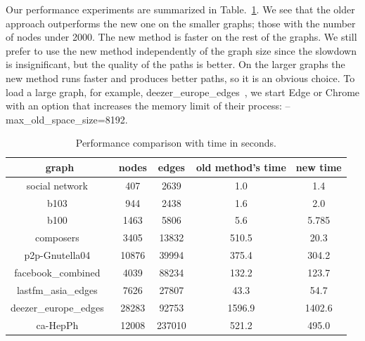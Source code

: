 \documentclass{gd-llncs}
\begin{document}
{Our performance experiments are summarized in Table.~\ref{tab:perf}. We see that the older approach outperforms the new one on the smaller graphs; 
those with the number of nodes under 2000. The new method is faster on the rest of the graphs. 
We still prefer to use the new method independently of the graph size since the slowdown is insignificant, but the quality of the paths is better. 
On the larger graphs the new method runs faster and produces better paths, so it is an obvious choice.
To load a large graph, for example, deezer\_europe\_edges~\cite{feather}, we start Edge or Chrome with an option that increases the memory limit
of their process: -- max\_old\_space\_size=8192.

\begin{table}
  \begin{center}
    \begin{tabular}{||c |c| c| c| c||}
      \hline
      graph                                   & nodes & edges  & old method's time & new time \\ [0.5ex]
      \hline\hline
      social network~\cite{beveridge2018game} & 407   & 2639   & 1.0               & 1.4      \\
      \hline
      b103~\cite{b103}                        & 944   & 2438   & 1.6               & 2.0      \\
      \hline
      b100~\cite{b100}                        & 1463  & 5806   & 5.6               & 5.785    \\
      \hline
      composers~\cite{composers}              & 3405  & 13832  & 510.5             & 20.3     \\
      \hline
      p2p-Gnutella04~\cite{gnutella}          & 10876 & 39994  & 375.4             & 304.2    \\
      \hline
      facebook\_combined~\cite{fb}            & 4039  & 88234  & 132.2             & 123.7    \\
      \hline
      lastfm\_asia\_edges~\cite{feather}      & 7626  & 27807  & 43.3              & 54.7     \\
      \hline
      deezer\_europe\_edges~\cite{feather}    & 28283 & 92753  & 1596.9            & 1402.6   \\
      \hline
      ca-HepPh~\cite{leskovec2007graph}       & 12008 & 237010 & 521.2             & 495.0    \\
      \hline
    \end{tabular}
    \caption{Performance comparison with time in seconds.}
    \label{tab:perf}
  \end{center}


\end{table}}
\end{document}
